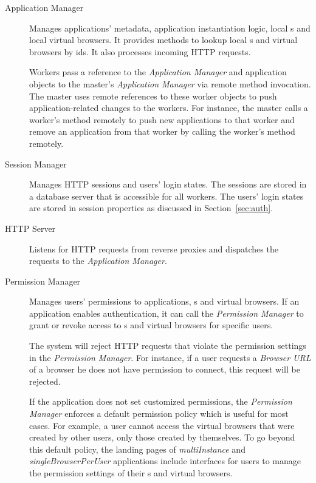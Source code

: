 \begin{description}

\item[Application Manager] Manages applications' metadata, application instantiation
logic, local \appins{}s
and local virtual browsers. It provides methods to lookup local \appins{}s and virtual
browsers by ids. It also processes incoming HTTP requests.

Workers pass a reference to the \emph{Application Manager} and application objects to
the master's \emph{Application Manager} via remote method invocation.  The
master uses remote references to these worker
objects to push application-related changes to the  workers.  For instance,
the master calls  a worker's  method remotely to
push new applications to that worker and remove an application from that worker
by calling the worker's  method remotely.

\item[Session Manager] 
Manages HTTP sessions and users' login states. The sessions
are stored in a database server that is accessible for all workers. 
The users' login states are stored in session properties 
as discussed in Section~\ref{sec:auth}.


\item[HTTP Server] Listens for HTTP requests from reverse proxies and dispatches 
    the requests to the \emph{Application Manager}. 

\item[Permission Manager] 
Manages users' permissions to applications, \appins{}s and virtual browsers.
If an application enables authentication, it can call the \emph{Permission
Manager} to grant or revoke access to  \appins{}s and virtual
browsers for specific users. 

The system will reject HTTP requests that violate
the permission settings in the  \emph{Permission Manager}. For instance, if a
user requests a \emph{Browser URL} of a browser he does not have permission to
connect, this request will be rejected. 

If the application does not set
customized permissions, the \emph{Permission Manager} enforces a default
permission policy which is useful for most cases.  For example, a user
cannot access the virtual browsers that were created by other users, only
those created by themselves.
To go beyond this default policy,
the landing pages of \emph{multiInstance} and \emph{singleBrowserPerUser}
applications include interfaces for users to manage the permission settings of
their \appins{}s and virtual browsers.

\end{description}



